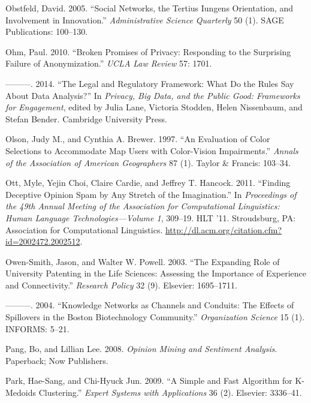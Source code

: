\documentclass[]{krantz}
\begin{document}
\hypertarget{ref-obstfeld2005social}{}
Obstfeld, David. 2005. ``Social Networks, the Tertius Iungens
Orientation, and Involvement in Innovation.'' \emph{Administrative
Science Quarterly} 50 (1). SAGE Publications: 100--130.

\hypertarget{ref-ohm2010broken}{}
Ohm, Paul. 2010. ``Broken Promises of Privacy: Responding to the
Surprising Failure of Anonymization.'' \emph{UCLA Law Review} 57: 1701.

\hypertarget{ref-Ohm2014}{}
---------. 2014. ``The Legal and Regulatory Framework: What Do the Rules
Say About Data Analysis?'' In \emph{Privacy, Big Data, and the Public
Good: Frameworks for Engagement}, edited by Julia Lane, Victoria
Stodden, Helen Nissenbaum, and Stefan Bender. Cambridge University
Press.

\hypertarget{ref-olson1997evaluation}{}
Olson, Judy M., and Cynthia A. Brewer. 1997. ``An Evaluation of Color
Selections to Accommodate Map Users with Color-Vision Impairments.''
\emph{Annals of the Association of American Geographers} 87 (1). Taylor
\& Francis: 103--34.

\hypertarget{ref-ott-11}{}
Ott, Myle, Yejin Choi, Claire Cardie, and Jeffrey T. Hancock. 2011.
``Finding Deceptive Opinion Spam by Any Stretch of the Imagination.'' In
\emph{Proceedings of the 49th Annual Meeting of the Association for
Computational Linguistics: Human Language Technologies---Volume 1},
309--19. HLT '11. Stroudsburg, PA: Association for Computational
Linguistics. \url{http://dl.acm.org/citation.cfm?id=2002472.2002512}.

\hypertarget{ref-owen2003expanding}{}
Owen-Smith, Jason, and Walter W. Powell. 2003. ``The Expanding Role of
University Patenting in the Life Sciences: Assessing the Importance of
Experience and Connectivity.'' \emph{Research Policy} 32 (9). Elsevier:
1695--1711.

\hypertarget{ref-owen2004knowledge}{}
---------. 2004. ``Knowledge Networks as Channels and Conduits: The
Effects of Spillovers in the Boston Biotechnology Community.''
\emph{Organization Science} 15 (1). INFORMS: 5--21.

\hypertarget{ref-pang-08}{}
Pang, Bo, and Lillian Lee. 2008. \emph{Opinion Mining and Sentiment
Analysis}. Paperback; Now Publishers.

\hypertarget{ref-park2009simple}{}
Park, Hae-Sang, and Chi-Hyuck Jun. 2009. ``A Simple and Fast Algorithm
for K-Medoids Clustering.'' \emph{Expert Systems with Applications} 36
(2). Elsevier: 3336--41.
\end{document}
